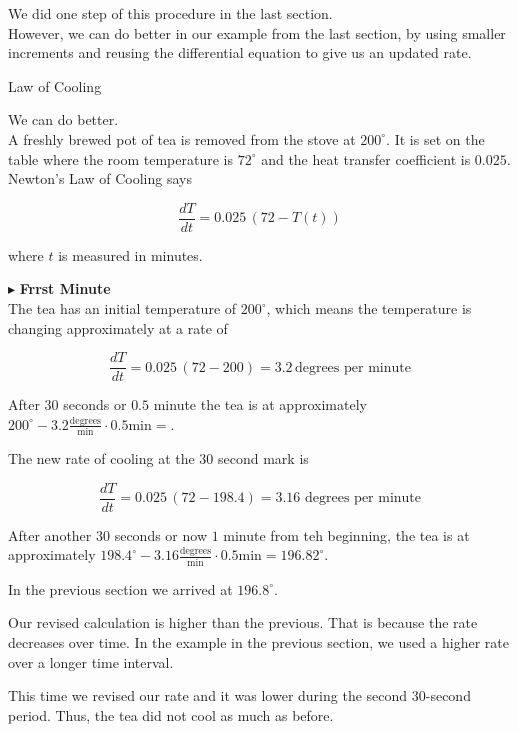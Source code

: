 \documentclass{ximera}
\begin{document}
We did one step of this procedure in the last section. \\


However, we can do better in our example from the last section, by using smaller increments and reusing the differential equation to give us an updated rate.






\begin{example} Law of Cooling 



We can do better. \\



A freshly brewed pot of tea is removed from the stove at $200^{\circ}$.  It is set on the table where the room temperature is $72^{\circ}$ and the heat transfer coefficient is $0.025$. \\


Newton's Law of Cooling says

\[
\frac{dT}{dt} = 0.025 \, (72 - T(t))
\]


where $t$ is measured in minutes.


$\blacktriangleright$ \textbf{Frrst Minute} \\

The tea has an initial temperature of $200^{\circ}$, which means the temperature is changing approximately at a rate of 


\[
\frac{dT}{dt} = 0.025 \, (72 - 200) = 3.2 \, \text{degrees per minute}
\]


After $30$ seconds or $0.5$ minute the tea is at approximately $200^{\circ} - 3.2 \frac{\text{degrees}}{\text{min}} \cdot 0.5 \text{min} = $.


The new rate of cooling at the $30$ second mark is


\[
\frac{dT}{dt} = 0.025 \, (72 - 198.4) = 3.16 \, \, \text{degrees per minute}
\]



After another $30$ seconds or now $1$ minute from teh beginning, the tea is at approximately $198.4^{\circ} - 3.16 \frac{\text{degrees}}{\text{min}} \cdot 0.5 \text{min} = 196.82^{\circ}$.


In the previous section we arrived at $196.8^{\circ}$.

\end{example}





\begin{observation}

Our revised calculation is higher than the previous.  That is because the rate decreases over time.  In the example in the previous section, we used a higher rate over a longer time interval.

This time we revised our rate and it was lower during the second $30$-second period.  Thus, the tea did not cool as much as before.
\end{observation}
\end{document}
